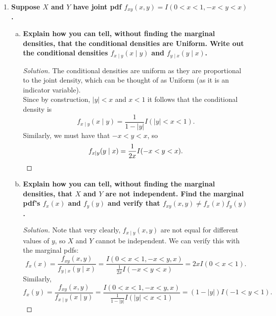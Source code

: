\documentclass[11pt]{article}
\newenvironment{solution}
  {\renewcommand\qedsymbol{$\blacksquare$}\begin{proof}[Solution]}
  {\end{proof}}
\begin{document}
\begin{enumerate}
\begin{enumerate}[a)]
      \begin{solution}
        For $Z_o \sim N(0, 1)$ independent of $Z_2$, define $Z_1 = \rho Z_2 + \sqrt{1-\rho^2}Z_o$ as stated. Note that $\sqrt{1-\rho^2}Z_o \sim N(0, 1-\rho^2)$. Conditioning on $Z_2 \mid z_2$, we find that
        \[
          Z_1 \mid z_2 \sim N(\rho Z_2, 1-\rho^2)
        \] 
        For $\rho = -\frac{\sqrt{3} }{2}$ (giving $1-\rho^2 = \frac{1}{4}$), we have
        \[
          Z_1 \mid z_2 \sim N\left( -\frac{\sqrt{3} }{2}z_2, \frac{1}{4} \right) 
        \]
        which matches the distribution of $Z_2 \mid z_1$ in part (b).
      \end{solution}
    \end{enumerate}

    \newpage
    
    \item \textbf{Suppose $X$ and $Y$ have joint pdf $f_{xy}(x, y) = I(0 < x < 1, -x < y < x)$.}
    \begin{enumerate}[a)]
      \item \textbf{Explain how you can tell, without finding the marginal densities, that the conditional densities are Uniform.
      Write out the conditional densities $f_{x \mid y}(x \mid y)$ and $f_{y \mid x}(y \mid x)$.}

      \begin{solution}
      The conditional densities are uniform as they are proportional to the joint density, which can be thought of as Uniform (as it is an indicator variable). \\

      Since by construction, $|y| < x$ and $x < 1$ it follows that the conditional density is
      \[
        f_{x \mid y}(x \mid y) = \frac{1}{1 - |y|} I(|y| < x < 1).
      \]
      Similarly, we must have that $-x < y < x$, so
      \[
        f_{x \mid y}(y \mid x) = \frac{1}{2x} I(-x < y < x). \qedhere
      \]\end{solution}
      \item \textbf{Explain how you can tell, without finding the marginal densities, that $X$ and $Y$ are not independent. Find the marginal pdf's $f_x(x)$ and $f_y(y)$ 
      and verify that $f_{xy}(x, y) \neq f_x(x)f_y(y)$.}

      \begin{solution}
      Note that very clearly, $f_{x \mid y}(x, y)$ are not equal for different values of $y$, so $X$ and $Y$ cannot be independent. We can verify this with the marginal pdfs:
      \[
        f_x(x) = \frac{f_{xy}(x, y)}{f_{y \mid x}(y \mid x)} = \frac{I(0 < x < 1, -x < y, x)}{\frac{1}{2x} I(-x < y < x)}= 2x I(0 < x < 1).
      \]
      Similarly, 
      \[
        f_x(y) = \frac{f_{xy}(x, y)}{f_{x \mid y}(x \mid y)} = \frac{I(0 < x < 1, -x < y, x)}{\frac{1}{1 - |y|} I(|y| < x < 1)}= (1- |y|) I(-1 < y < 1).
      \]


\end{solution}
\end{enumerate}
\end{enumerate}
\end{document}
